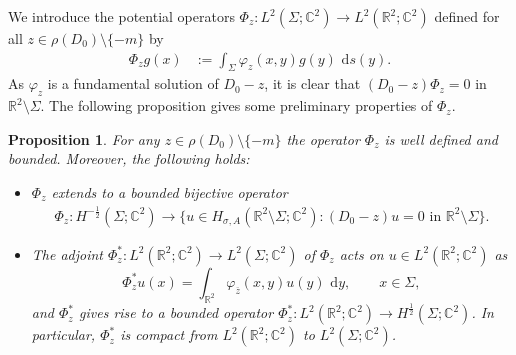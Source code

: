 \documentclass[11pt,a4paper,reqno,oneside]{amsproc}
\newcommand{\ddd}{\,\mathrm{d}}
\def \rr {{\mathbb R}}
\numberwithin{equation}{section}
\def\var{\varphi}
\newtheorem{proposition}[definition]{Proposition}
\begin{document}
We introduce the potential operators $\Phi_z: L^2(\Sigma; \mathbb{C}^2) \rightarrow L^2(\rr^2; \mathbb{C}^2)$ defined for all $z\in\rho(D_0)\setminus\{-m\}$ by
\begin{align} \label{def_Phi_z}
	\Phi_z   g(x) &:= \int_\Sigma \var_z (x,y) g(y) \,\ddd s(y). %
\end{align}
As $\var_z$ is a fundamental solution of $D_0-z$, it is clear that $(D_0-z)\Phi_z=0$ in $\rr^2\setminus\Sigma$. The following proposition gives some preliminary properties of $\Phi_z$.
\begin{proposition}\label{Basic_Phi}For any $z\in\rho(D_0)\setminus\{-m\}$ the operator $\Phi_z$ is well defined and bounded. Moreover, the following holds:
    \begin{itemize}
	  \item[$\textup{(i)}$]  $\Phi_z$ extends to a bounded bijective operator
	\begin{equation*}
	\begin{split}
	\Phi_z :H^{-\frac{1}{2}}(\Sigma;\mathbb{C}^2) \to \{ u\in H_{\sigma, A}(\rr^2\setminus\Sigma;\mathbb{C}^2): (D_0-z) u=0 \text{ in } \rr^2\setminus\Sigma\}.
	\end{split}
	\end{equation*}
	\item[$\textup{(ii)}$] The adjoint $\Phi_z^*: L^2(\rr^2; \mathbb{C}^2) \to  L^2(\Sigma; \mathbb{C}^2)$ of $\Phi_z$ acts on $u \in L^2(\rr^2; \mathbb{C}^2)$ as
	\begin{equation} \label{adj_Phi}
	  \Phi_{z}^* u(x) = \int_{\rr^2} \var_{\overline{ z}}(x,y) u(y) \, \ddd y, \qquad x \in \Sigma,
	\end{equation}
	and $\Phi_z^*$ gives rise to a bounded operator $\Phi_z^*: L^2(\rr^2; \mathbb{C}^2) \rightarrow H^{\frac{1}{2}}(\Sigma; \mathbb{C}^2)$. In particular, $\Phi_z^*$ is compact from $ L^2(\rr^2; \mathbb{C}^2)$ to $L^2(\Sigma; \mathbb{C}^2)$.
	\end{itemize}
\end{proposition}
\end{document}
